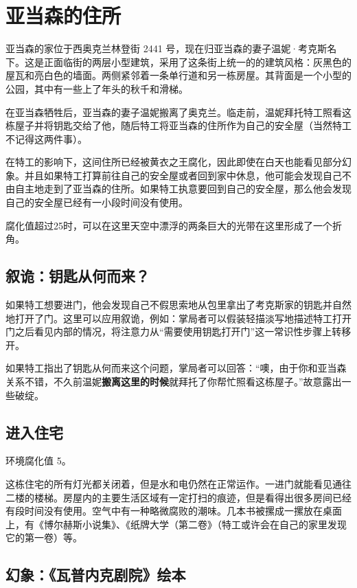 \section{亚当森的住所}

亚当森的家位于西奥克兰林登街 2441 号，现在归亚当森的妻子温妮·考克斯名下。这是正面临街的两层小型建筑，采用了这条街上统一的的建筑风格：灰黑色的屋瓦和亮白色的墙面。两侧紧邻着一条单行道和另一栋房屋。其背面是一个小型的公园，其中有一些上了年头的秋千和滑梯。

在亚当森牺牲后，亚当森的妻子温妮搬离了奥克兰。临走前，温妮拜托特工照看这栋屋子并将钥匙交给了他，随后特工将亚当森的住所作为自己的安全屋（当然特工不记得这两件事）。

在特工的影响下，这间住所已经被黄衣之王腐化，因此即使在白天也能看见部分幻象。并且如果特工打算前往自己的安全屋或者回到家中休息，他可能会发现自己不由自主地走到了亚当森的住所。如果特工执意要回到自己的安全屋，那么他会发现自己的安全屋已经有一小段时间没有使用。

腐化值超过25时，可以在这里天空中漂浮的两条巨大的光带在这里形成了一个折角。

\subsection{叙诡：钥匙从何而来？}
如果特工想要进门，他会发现自己不假思索地从包里拿出了考克斯家的钥匙并自然地打开了门。这里可以应用叙诡，例如：掌局者可以假装轻描淡写地描述特工打开门之后看见内部的情况，将注意力从“需要使用钥匙打开门”这一常识性步骤上转移开。

如果特工指出了钥匙从何而来这个问题，掌局者可以回答：“噢，由于你和亚当森关系不错，不久前温妮\textbf{搬离这里的时候}就拜托了你帮忙照看这栋屋子。”故意露出一些破绽。

\subsection{进入住宅}

环境腐化值 5。

这栋住宅的所有灯光都关闭着，但是水和电仍然在正常运作。一进门就能看见通往二楼的楼梯。房屋内的主要生活区域有一定打扫的痕迹，但是看得出很多房间已经有段时间没有使用。空气中有一种略微腐败的潮味。几本书被摞成一摞放在桌面上，有《博尔赫斯小说集》、《纸牌大学（第二卷》（特工或许会在自己的家里发现它的第一卷）等。

\subsection{幻象：《瓦普内克剧院》绘本}


